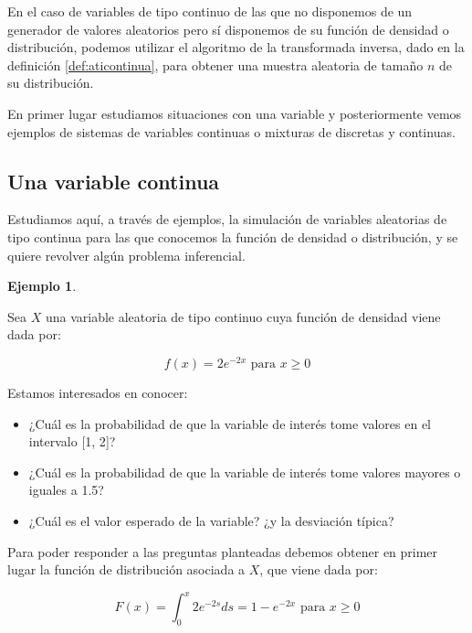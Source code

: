 \documentclass[
]{book}
\providecommand{\tightlist}{%
  \setlength{\itemsep}{0pt}\setlength{\parskip}{0pt}}
\theoremstyle{definition}
\theoremstyle{definition}
\newtheorem{example}{Ejemplo}[chapter]
\theoremstyle{definition}
\theoremstyle{definition}
\theoremstyle{remark}
\begin{document}
En el caso de variables de tipo continuo de las que no disponemos de un generador de valores aleatorios pero sí disponemos de su función de densidad o distribución, podemos utilizar el algoritmo de la transformada inversa, dado en la definición \ref{def:aticontinua}, para obtener una muestra aleatoria de tamaño \(n\) de su distribución.

En primer lugar estudiamos situaciones con una variable y posteriormente vemos ejemplos de sistemas de variables continuas o mixturas de discretas y continuas.

\hypertarget{una-variable-continua}{%
\subsection{Una variable continua}\label{una-variable-continua}}

Estudiamos aquí, a través de ejemplos, la simulación de variables aleatorias de tipo continua para las que conocemos la función de densidad o distribución, y se quiere revolver algún problema inferencial.

\begin{example}
\protect\hypertarget{exm:cont1}{}\label{exm:cont1}

Sea \(X\) una variable aleatoria de tipo continuo cuya función de densidad viene dada por:

\begin{equation*}
f(x) = 2e^{-2x}  \text{ para } x \geq 0
\end{equation*}

Estamos interesados en conocer:

\begin{itemize}
\tightlist
\item
  ¿Cuál es la probabilidad de que la variable de interés tome valores en el intervalo {[}1, 2{]}?
\item
  ¿Cuál es la probabilidad de que la variable de interés tome valores mayores o iguales a 1.5?
\item
  ¿Cuál es el valor esperado de la variable? ¿y la desviación típica?
\end{itemize}

\end{example}

Para poder responder a las preguntas planteadas debemos obtener en primer lugar la función de distribución asociada a \(X\), que viene dada por:

\begin{equation}
F(x) = \int_0^x 2e^{-2s} ds=1 - e^{-2x} \text{ para } x \geq 0
\label{eq:fd1-16}
\end{equation}
\end{document}
